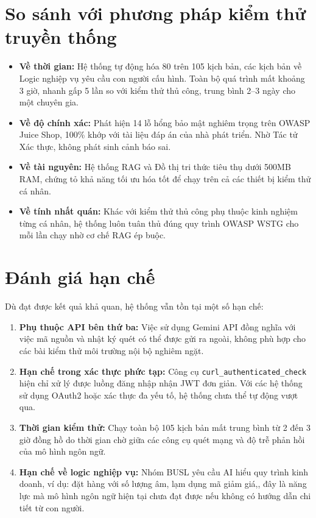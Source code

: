 \section{So sánh với phương pháp kiểm thử truyền thống}
\begin{itemize}
    \item \textbf{Về thời gian:} Hệ thống tự động hóa 80 trên 105 kịch bản, các kịch bản về Logic nghiệp vụ yêu cầu con người cấu hình. Toàn bộ quá trình mất khoảng 3 giờ, nhanh gấp 5 lần so với kiểm thử thủ công, trung bình 2--3 ngày cho một chuyên gia.
    \item \textbf{Về độ chính xác:} Phát hiện 14 lỗ hổng bảo mật nghiêm trọng trên OWASP Juice Shop, 100\% khớp với tài liệu đáp án của nhà phát triển. Nhờ Tác tử Xác thực, không phát sinh cảnh báo sai.
    \item \textbf{Về tài nguyên:} Hệ thống RAG và Đồ thị tri thức tiêu thụ dưới 500MB RAM, chứng tỏ khả năng tối ưu hóa tốt để chạy trên cả các thiết bị kiểm thử cá nhân.
    \item \textbf{Về tính nhất quán:} Khác với kiểm thử thủ công phụ thuộc kinh nghiệm từng cá nhân, hệ thống luôn tuân thủ đúng quy trình OWASP WSTG cho mỗi lần chạy nhờ cơ chế RAG ép buộc.
\end{itemize}

\section{Đánh giá hạn chế}
Dù đạt được kết quả khả quan, hệ thống vẫn tồn tại một số hạn chế:
\begin{enumerate}
    \item \textbf{Phụ thuộc API bên thứ ba:} Việc sử dụng Gemini API đồng nghĩa với việc mã nguồn và nhật ký quét có thể được gửi ra ngoài, không phù hợp cho các bài kiểm thử môi trường nội bộ nghiêm ngặt.
    \item \textbf{Hạn chế trong xác thực phức tạp:} Công cụ \texttt{curl\_authenticated\_check} hiện chỉ xử lý được luồng đăng nhập nhận JWT đơn giản. Với các hệ thống sử dụng OAuth2 hoặc xác thực đa yếu tố, hệ thống chưa thể tự động vượt qua.
    \item \textbf{Thời gian kiểm thử:} Chạy toàn bộ 105 kịch bản mất trung bình từ 2 đến 3 giờ đồng hồ do thời gian chờ giữa các công cụ quét mạng và độ trễ phản hồi của mô hình ngôn ngữ.
    \item \textbf{Hạn chế về logic nghiệp vụ:} Nhóm BUSL yêu cầu AI hiểu quy trình kinh doanh, ví dụ: đặt hàng với số lượng âm, lạm dụng mã giảm giá,, đây là năng lực mà mô hình ngôn ngữ hiện tại chưa đạt được nếu không có hướng dẫn chi tiết từ con người.
\end{enumerate}
